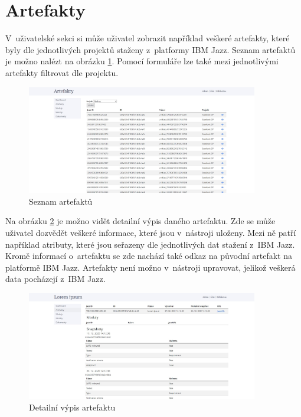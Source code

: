 \documentclass[czech,master]{diploma}
\begin{document}
\section{Artefakty}
V~uživatelské sekci si může uživatel zobrazit například veškeré artefakty, které byly dle jednotlivých projektů staženy z~platformy IBM Jazz. Seznam artefaktů je možno nalézt na obrázku \ref{fig:metrics_tool_artifacts}. Pomocí formuláře lze také mezi jednotlivými artefakty filtrovat dle projektu.

\begin{figure}[!ht]
    \centering
    \includegraphics[width=0.9\textwidth]{Diplomka/Figures/metrics_tool/artifacts.jpg}
    \caption{Seznam artefaktů}
    \label{fig:metrics_tool_artifacts}
\end{figure}

Na obrázku \ref{fig:metrics_tool_artifacts_detail} je možno vidět detailní výpis daného artefaktu. Zde se může uživatel dozvědět veškeré informace, které jsou v~nástroji uloženy. Mezi ně patří například atributy, které jsou seřazeny dle jednotlivých dat stažení z~IBM Jazz. Kromě informací o~artefaktu se zde nachází také odkaz na původní artefakt na platformě IBM Jazz. Artefakty není možno v~nástroji upravovat, jelikož veškerá data pocházejí z~IBM Jazz.

\begin{figure}[!ht]
    \centering
    \includegraphics[width=0.9\textwidth]{Diplomka/Figures/metrics_tool/artifacts_detail.jpg}
    \caption{Detailní výpis artefaktu}
    \label{fig:metrics_tool_artifacts_detail}
\end{figure}
\end{document}
